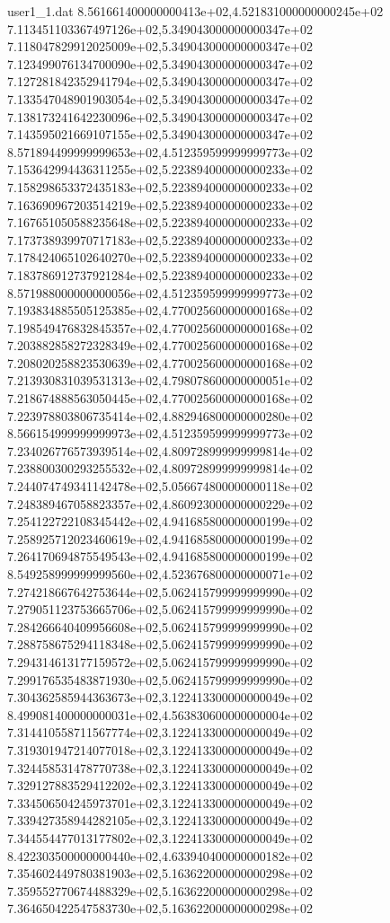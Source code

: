 \begin{filecontents}{user1_1.dat}
8.561661400000000413e+02,4.521831000000000245e+02
7.113451103367497126e+02,5.349043000000000347e+02
7.118047829912025009e+02,5.349043000000000347e+02
7.123499076134700090e+02,5.349043000000000347e+02
7.127281842352941794e+02,5.349043000000000347e+02
7.133547048901903054e+02,5.349043000000000347e+02
7.138173241642230096e+02,5.349043000000000347e+02
7.143595021669107155e+02,5.349043000000000347e+02
8.571894499999999653e+02,4.512359599999999773e+02
7.153642994436311255e+02,5.223894000000000233e+02
7.158298653372435183e+02,5.223894000000000233e+02
7.163690967203514219e+02,5.223894000000000233e+02
7.167651050588235648e+02,5.223894000000000233e+02
7.173738939970717183e+02,5.223894000000000233e+02
7.178424065102640270e+02,5.223894000000000233e+02
7.183786912737921284e+02,5.223894000000000233e+02
8.571988000000000056e+02,4.512359599999999773e+02
7.193834885505125385e+02,4.770025600000000168e+02
7.198549476832845357e+02,4.770025600000000168e+02
7.203882858272328349e+02,4.770025600000000168e+02
7.208020258823530639e+02,4.770025600000000168e+02
7.213930831039531313e+02,4.798078600000000051e+02
7.218674888563050445e+02,4.770025600000000168e+02
7.223978803806735414e+02,4.882946800000000280e+02
8.566154999999999973e+02,4.512359599999999773e+02
7.234026776573939514e+02,4.809728999999999814e+02
7.238800300293255532e+02,4.809728999999999814e+02
7.244074749341142478e+02,5.056674800000000118e+02
7.248389467058823357e+02,4.860923000000000229e+02
7.254122722108345442e+02,4.941685800000000199e+02
7.258925712023460619e+02,4.941685800000000199e+02
7.264170694875549543e+02,4.941685800000000199e+02
8.549258999999999560e+02,4.523676800000000071e+02
7.274218667642753644e+02,5.062415799999999990e+02
7.279051123753665706e+02,5.062415799999999990e+02
7.284266640409956608e+02,5.062415799999999990e+02
7.288758675294118348e+02,5.062415799999999990e+02
7.294314613177159572e+02,5.062415799999999990e+02
7.299176535483871930e+02,5.062415799999999990e+02
7.304362585944363673e+02,3.122413300000000049e+02
8.499081400000000031e+02,4.563830600000000004e+02
7.314410558711567774e+02,3.122413300000000049e+02
7.319301947214077018e+02,3.122413300000000049e+02
7.324458531478770738e+02,3.122413300000000049e+02
7.329127883529412202e+02,3.122413300000000049e+02
7.334506504245973701e+02,3.122413300000000049e+02
7.339427358944282105e+02,3.122413300000000049e+02
7.344554477013177802e+02,3.122413300000000049e+02
8.422303500000000440e+02,4.633940400000000182e+02
7.354602449780381903e+02,5.163622000000000298e+02
7.359552770674488329e+02,5.163622000000000298e+02
7.364650422547583730e+02,5.163622000000000298e+02

\end{filecontents}
